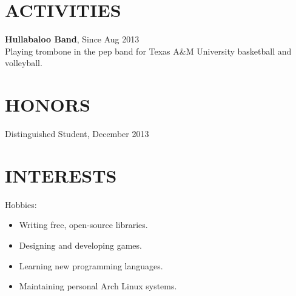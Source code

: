 \documentclass[margin]{res}
\begin{document}
\begin{resume}
\section{ACTIVITIES}
\textbf{Hullabaloo Band}, Since Aug 2013\\
Playing trombone in the pep band for Texas A\&M University basketball and volleyball.

\section{HONORS}
Distinguished Student, December 2013

\section{INTERESTS}
Hobbies:
\begin{itemize}
  \item Writing free, open-source libraries.
  \item Designing and developing games.
  \item Learning new programming languages.
  \item Maintaining personal Arch Linux systems.
\end{itemize}

\end{resume}
\end{document}
